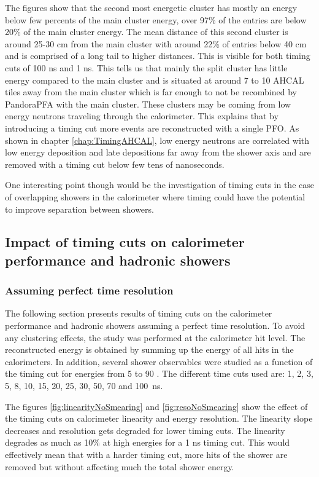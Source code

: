 The figures show that the second most energetic cluster has mostly an energy below few percents of the main cluster energy, over 97\% of the entries are below 20\% of the main cluster energy. The mean distance of this second cluster is around 25-30 cm from the main cluster with around 22\% of entries below 40 cm and is comprised of a long tail to higher distances. This is visible for both timing cuts of 100 ns and 1 ns. This tells us that mainly the split cluster has little energy compared to the main cluster and is situated at around 7 to 10 AHCAL tiles away from the main cluster which is far enough to not be recombined by PandoraPFA with the main cluster. These clusters may be coming from low energy neutrons traveling through the calorimeter. This explains that by introducing a timing cut more events are reconstructed with a single PFO. As shown in chapter \ref{chap:TimingAHCAL}, low energy neutrons are correlated with low energy deposition and late depositions far away from the shower axis and are removed with a timing cut below few tens of nanoseconds.

One interesting point though would be the investigation of timing cuts in the case of overlapping showers in the calorimeter where timing could have the potential to improve separation between showers.

\subsection{Impact of timing cuts on calorimeter performance and hadronic showers}

\subsubsection{Assuming perfect time resolution}

The following section presents results of timing cuts on the calorimeter performance and hadronic showers assuming a perfect time resolution. To avoid any clustering effects, the study was performed at the calorimeter hit level. The reconstructed energy is obtained by summing up the energy of all hits in the calorimeters. In addition, several shower observables were studied as a function of the timing cut for energies from 5 \GeV to 90 \GeV \kzeroL. The different time cuts used are: 1, 2, 3, 5, 8, 10, 15, 20, 25, 30, 50, 70 and \SI{100}{\nano\second}.

The figures \ref{fig:linearityNoSmearing} and \ref{fig:resoNoSmearing} show the effect of the timing cuts on calorimeter linearity and energy resolution. The linearity slope decreases and resolution gets degraded for lower timing cuts. The linearity degrades as much as 10\% at high energies for a 1 ns timing cut. This would effectively mean that with a harder timing cut, more hits of the shower are removed but without affecting much the total shower energy.


